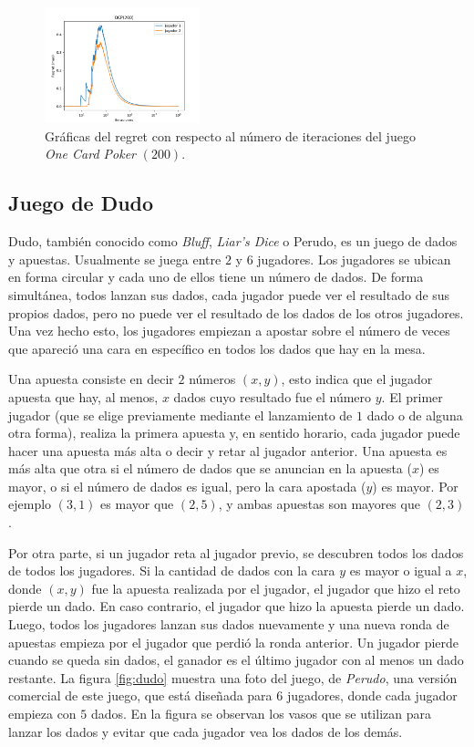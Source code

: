 \begin{figure}[h]
    \centering
    \includegraphics[width=0.4\textwidth]{graficas/cfr/ocp/OCP(200).png}
    \caption{Gráficas del regret con respecto al número de iteraciones del juego \textit{One Card Poker} $(200)$.}
    \label{fig:cfr-regret-ocp-200}
\end{figure}

\subsection*{Juego de Dudo}
Dudo, también conocido como \textit{Bluff}, \textit{Liar's Dice} o Perudo, es un juego de dados y apuestas. Usualmente se juega entre $2$ y $6$ jugadores. Los jugadores se ubican en forma circular y cada uno de ellos tiene un número de dados. De forma simultánea, todos lanzan sus dados, cada jugador puede ver el resultado de sus propios dados, pero no puede ver el resultado de los dados de los otros jugadores. Una vez hecho esto, los jugadores empiezan a apostar sobre el número de veces que apareció una cara en específico en todos los dados que hay en la mesa.

Una apuesta consiste en decir $2$ números $(x, y)$, esto indica que el jugador apuesta que hay, al menos, $x$ dados cuyo resultado fue el número $y$. El primer jugador (que se elige previamente mediante el lanzamiento de $1$ dado o de alguna otra forma), realiza la primera apuesta y, en sentido horario, cada jugador puede hacer una apuesta más alta o decir  y retar al jugador anterior. Una apuesta es más alta que otra si el número de dados que se anuncian en la apuesta ($x$) es mayor, o si el número de dados es igual, pero la cara apostada ($y$) es mayor. Por ejemplo $(3, 1)$ es mayor que $(2, 5)$, y ambas apuestas son mayores que $(2, 3)$.

Por otra parte, si un jugador reta al jugador previo, se descubren todos los dados de todos los jugadores. Si la cantidad de dados con la cara $y$ es mayor o igual a $x$, donde $(x, y)$ fue la apuesta realizada por el jugador, el jugador que hizo el reto pierde un dado. En caso contrario, el jugador que hizo la apuesta pierde un dado. Luego, todos los jugadores lanzan sus dados nuevamente y una nueva ronda de apuestas empieza por el jugador que perdió la ronda anterior. Un jugador pierde cuando se queda sin dados, el ganador es el último jugador con al menos un dado restante. La figura \ref{fig:dudo} muestra una foto del juego, de \textit{Perudo}, una versión comercial de este juego, que está diseñada para $6$ jugadores, donde cada jugador empieza con $5$ dados. En la figura se observan los vasos que se utilizan para lanzar los dados y evitar que cada jugador vea los dados de los demás.

